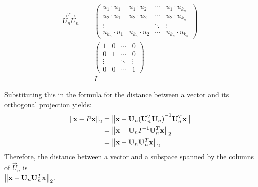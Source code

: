 \begin{align*}
    \vec{U}_n^T \vec{U}_n & = \left(
    \begin{array}{cccc}
            u_1\cdot u_1   & u_1\cdot u_2   & \cdots & u_1\cdot u_{k_n}   \\
            u_2\cdot u_1   & u_2\cdot u_2   & \cdots & u_2\cdot u_{k_n}   \\
            \vdots         &                & \ddots & \vdots           \\
            u_{k_n}\cdot u_1 & u_{k_n}\cdot u_2 & \cdots & u_{k_n}\cdot u_{k_n}
        \end{array}\right) \\
                          &
    = \left(\begin{array}{cccc}
            1      & 0 & \cdots & 0      \\
            0      & 1 & \cdots & 0      \\
            \vdots &   & \ddots & \vdots \\
            0      & 0 & \cdots & 1
        \end{array}
    \right)                           \\
                          & = I
\end{align*}

Substituting this in the formula for the distance between a vector and its orthogonal projection yields:
\begin{align*}
    \left\lVert\mathbf{x} - P\mathbf{x}\right\rVert_2 & = \big\rVert\mathbf{x} - \mathbf{U}_n{(\mathbf{U}_n^T \mathbf{U}_n)}^{-1}\mathbf{U}_n^T\mathbf{x}\big\rVert \\
                              & = \left\lVert\mathbf{x} - \mathbf{U}_n I^{-1}\mathbf{U}_n^T\mathbf{x}\right\rVert_2                                     \\
                              & = \left\lVert\mathbf{x} - \mathbf{U}_n\mathbf{U}_n^T\mathbf{x}\right\rVert_2
\end{align*}
Therefore, the distance between a vector and a subspace spanned by the columns of \(\vec{U}_n\) is\\ \(\left\lVert\mathbf{x} - \mathbf{U}_n\mathbf{U}_n^T\mathbf{x}\right\rVert_2\).

